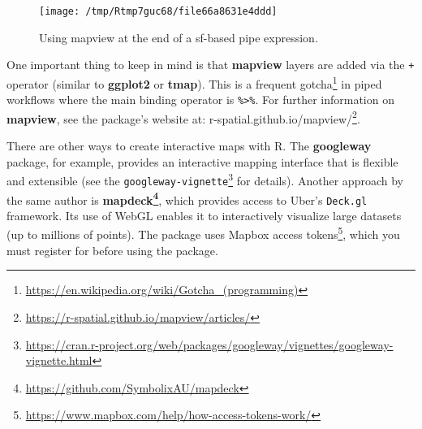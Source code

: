 \documentclass[]{krantz}
\newenvironment{Shaded}{\begin{snugshade}}{\end{snugshade}}
\newcommand{\DataTypeTok}[1]{\textcolor[rgb]{0.27,0.27,0.27}{#1}}
\newcommand{\DecValTok}[1]{\textcolor[rgb]{0.06,0.06,0.06}{#1}}
\newcommand{\KeywordTok}[1]{\textcolor[rgb]{0.27,0.27,0.27}{\textbf{#1}}}
\newcommand{\NormalTok}[1]{#1}
\newcommand{\OperatorTok}[1]{\textcolor[rgb]{0.43,0.43,0.43}{\textbf{#1}}}
\newcommand{\OtherTok}[1]{\textcolor[rgb]{0.37,0.37,0.37}{#1}}
\newcommand{\StringTok}[1]{\textcolor[rgb]{0.5,0.5,0.5}{#1}}
\let\rmarkdownfootnote\footnote%
\def\footnote{\protect\rmarkdownfootnote}
\renewcommand{\href}[2]{#2\footnote{\url{#1}}}
\begin{document}
\begin{Shaded}
\end{Shaded}

\begin{figure}[t]

{\centering \texttt{[image: /tmp/Rtmp7guc68/file66a8631e4ddd]} 

}

\caption{Using mapview at the end of a sf-based pipe expression.}\label{fig:mapview2}
\end{figure}

One important thing to keep in mind is that \textbf{mapview} layers are added via the \texttt{+} operator (similar to \textbf{ggplot2} or \textbf{tmap}). This is a frequent \href{https://en.wikipedia.org/wiki/Gotcha_(programming)}{gotcha} in piped workflows where the main binding operator is \texttt{\%\textgreater{}\%}.
For further information on \textbf{mapview}, see the package's website at: \href{https://r-spatial.github.io/mapview/articles/}{r-spatial.github.io/mapview/}.

There are other ways to create interactive maps with R.
The \textbf{googleway} package, for example, provides an interactive mapping interface that is flexible and extensible
(see the \href{https://cran.r-project.org/web/packages/googleway/vignettes/googleway-vignette.html}{\texttt{googleway-vignette}} for details).
Another approach by the same author is \textbf{\href{https://github.com/SymbolixAU/mapdeck}{mapdeck}}, which provides access to Uber's \texttt{Deck.gl} framework.
Its use of WebGL enables it to interactively visualize large datasets (up to millions of points).
The package uses Mapbox \href{https://www.mapbox.com/help/how-access-tokens-work/}{access tokens}, which you must register for before using the package.
\end{document}

